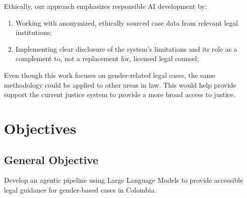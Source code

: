 Ethically, our approach emphasizes responsible AI development by:

\begin{enumerate}
\item Working with anonymized, ethically sourced case data from relevant legal institutions;
\item Implementing clear disclosure of the system’s limitations and its role as a complement to, not a replacement for, licensed legal counsel;
\end{enumerate}


Even though this work focuses on gender-related legal cases, the same methodology could be applied to other areas in law. This would help provide support the current justice system to provide a more broad access to justice.
\section{Objectives}

\subsection{General Objective}
Develop an agentic pipeline using Large Language Models to provide accessible legal guidance for gender-based cases in Colombia.

